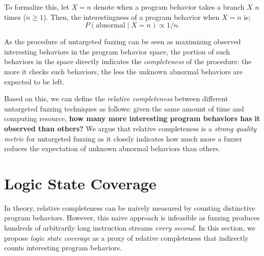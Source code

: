 \documentclass[letterpaper,twocolumn,10pt]{article}
\begin{document}
To formalize this, let $X=n$ denote when a program behavior takes a 
branch $X$ $n$ times ($n \ge 1$). Then, the interestingness of a program
behavior when $X=n$ is;
%
\begin{equation}
  P(\mathrm{abnormal} \mid X=n) \propto 1/n.
\end{equation}



%
As the procedure of untargeted fuzzing can be seen as maximizing observed
interesting behaviors in the program behavior space, the portion of such 
behaviors in the space directly indicates the \emph{completeness} of the
procedure: the more it checks such behaviors, the less the unknown
abnormal behaviors are expected to be left.

Based on this, we can define the \emph{relative completeness} between
different untargeted fuzzing techniques as follows: given the same amount of
time and computing resource, \textbf{how many more interesting program behaviors
has it observed than others?} We argue that relative completeness is a
\emph{strong quality metric} for untargeted fuzzing as it closely indicates how
much more a fuzzer reduces the expectation of unknown abnormal behaviors than
others. 



\section{Logic State Coverage}
\label{s:lscov}

In theory, relative completeness can be naively measured by counting distinctive
program behaviors. However, this naive approach is infeasible as fuzzing
produces hundreds of arbitrarily long instruction streams \emph{every second}.
%
In this section, we propose \emph{logic state coverage} as a proxy of relative
completeness that indirectly counts interesting program behaviors.
\end{document}

